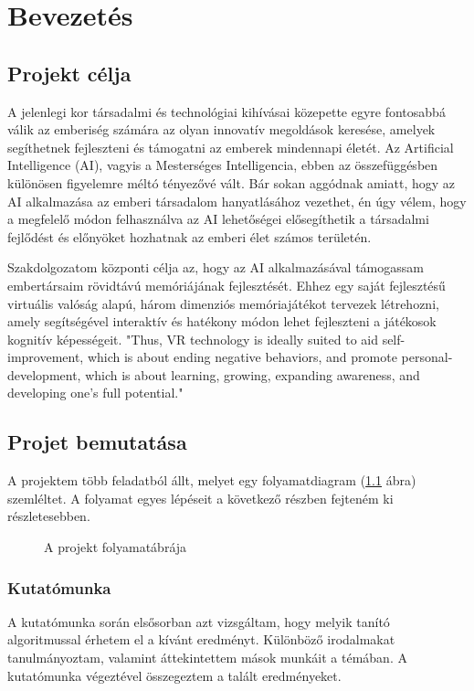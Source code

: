 \chapter{Bevezetés}
\usetikzlibrary{shapes,arrows}

\thispagestyle{fancy}
\pagestyle{fancy}
\section{Projekt célja}
A jelenlegi kor társadalmi és technológiai kihívásai közepette egyre fontosabbá válik az emberiség számára az olyan innovatív megoldások keresése, amelyek segíthetnek fejleszteni és támogatni az emberek mindennapi életét. Az Artificial Intelligence (AI), vagyis a Mesterséges Intelligencia, ebben az összefüggésben különösen figyelemre méltó tényezővé vált. Bár sokan aggódnak amiatt, hogy az AI alkalmazása az emberi társadalom hanyatlásához vezethet, én úgy vélem, hogy a megfelelő módon felhasználva az AI lehetőségei elősegíthetik a társadalmi fejlődést és előnyöket hozhatnak az emberi élet számos területén.

Szakdolgozatom központi célja az, hogy az AI alkalmazásával támogassam embertársaim rövidtávú memóriájának fejlesztését. Ehhez egy saját fejlesztésű virtuális valóság alapú, három dimenziós memóriajátékot tervezek létrehozni, amely segítségével interaktív és hatékony módon lehet fejleszteni a játékosok kognitív képességeit. 
"Thus, VR technology is ideally suited to aid self-improvement, which is about ending negative behaviors, and promote personal-development, which is about learning, growing, expanding awareness, and developing one's full potential." \cite{4634261}
\section{Projet bemutatása}

A projektem több feladatból állt, melyet egy folyamatdiagram (\ref{fig:folyamat_diagram} ábra) szemléltet. A folyamat egyes lépéseit a következő részben fejteném ki részletesebben.
\begin{figure}[H]
    \centering
    
    \caption{A projekt folyamatábrája}
    \label{fig:folyamat_diagram}
\end{figure}

\subsection{Kutatómunka}
A kutatómunka során elsősorban azt vizsgáltam, hogy melyik tanító algoritmussal érhetem el a kívánt eredményt. Különböző irodalmakat tanulmányoztam, valamint áttekintettem mások munkáit a témában. A kutatómunka végeztével összegeztem a talált eredményeket.

